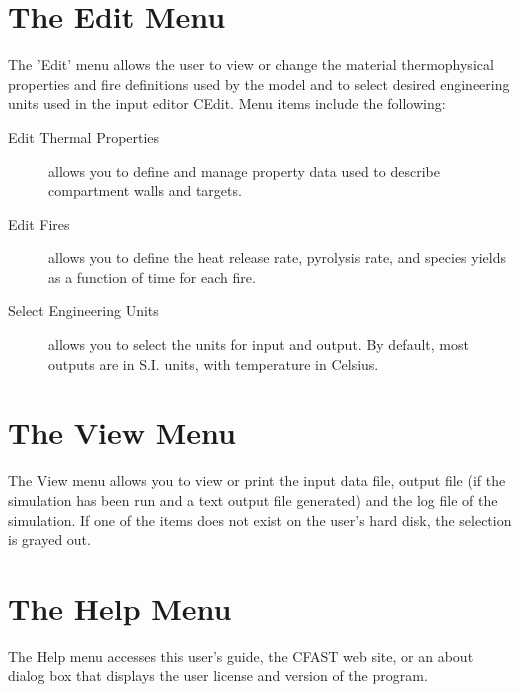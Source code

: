 \section{The Edit Menu}


The 'Edit' menu allows the user to view or change the material thermophysical properties and fire definitions used by the model and to select desired engineering units used in the input editor CEdit. Menu items include the following:
\begin{description}
\item[Edit Thermal Properties] allows you to define and manage property data used to describe compartment walls and targets.
\item[Edit Fires] allows you to define the heat release rate, pyrolysis rate, and species yields as a function of time for each fire.  
\item[Select Engineering Units] allows you to select the units for input and output. By default, most outputs are in S.I. units, with temperature in Celsius.
\end{description}

\section{The View Menu}

The View menu allows you to view or print the input data file, output file (if the simulation has been run and a text output file generated) and the log file of the simulation. If one of the items does not exist on the user's hard disk, the selection is grayed out.

\section{The Help Menu}

The Help menu accesses this user's guide, the CFAST web site, or an about dialog box that displays the user license and version of the program.







